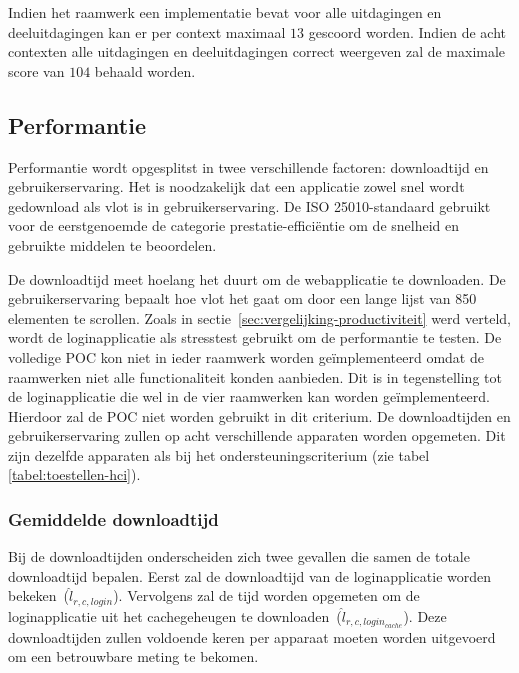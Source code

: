 Indien het raamwerk een implementatie bevat voor alle uitdagingen en deeluitdagingen kan er per context maximaal $13$ gescoord worden.
Indien de acht contexten alle uitdagingen en deeluitdagingen correct weergeven zal de maximale score van $104$ behaald worden.


\subsection{Performantie}
\label{sec:vergelijking-performantie}
Performantie wordt opgesplitst in twee verschillende factoren: downloadtijd en gebruikerservaring.
Het is noodzakelijk dat een applicatie zowel snel wordt gedownload als vlot is in gebruikerservaring.
De ISO 25010-standaard gebruikt voor de eerstgenoemde de categorie prestatie-efficiëntie om de snelheid en gebruikte middelen te beoordelen.

De downloadtijd meet hoelang het duurt om de webapplicatie te downloaden.
De gebruikerservaring bepaalt hoe vlot het gaat om door een lange lijst van 850 elementen te scrollen.
Zoals in sectie~\ref{sec:vergelijking-productiviteit} werd verteld, wordt de loginapplicatie als stresstest gebruikt om de performantie te testen.
De volledige POC kon niet in ieder raamwerk worden geïmplementeerd omdat de raamwerken niet alle functionaliteit konden aanbieden.
Dit is in tegenstelling tot de loginapplicatie die wel in de vier raamwerken kan worden geïmplementeerd.
Hierdoor zal de POC niet worden gebruikt in dit criterium.
De downloadtijden en gebruikerservaring zullen op acht verschillende apparaten worden opgemeten.
Dit zijn dezelfde apparaten als bij het ondersteuningscriterium (zie tabel \ref{tabel:toestellen-hci}).

\subsubsection{Gemiddelde downloadtijd}
Bij de downloadtijden onderscheiden zich twee gevallen die samen de totale downloadtijd bepalen.
Eerst zal de downloadtijd van de loginapplicatie worden bekeken~($\widehat{l}_{r,c,login}$). 
Vervolgens zal de tijd worden opgemeten om de loginapplicatie uit het cachegeheugen te downloaden~($\widehat{l}_{r,c,login_{cache}}$).
Deze downloadtijden zullen voldoende keren per apparaat moeten worden uitgevoerd om een betrouwbare meting te bekomen.

